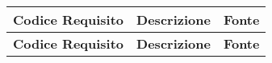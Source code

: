 \renewcommand{\arraystretch}{1.5} %

\begin{longtable}{|c|>{\centering\arraybackslash}p{}|c|} %
    \hline
    \rowcolor{green!30} %
    \textbf{Codice Requisito} & \textbf{Descrizione} & \textbf{Fonte} \\
    \hline
    \endfirsthead %
    
    \hline
    \rowcolor{green!30} %
    \textbf{Codice Requisito} & \textbf{Descrizione} & \textbf{Fonte} \\
    \hline
    \endhead %
    

\end{longtable}

